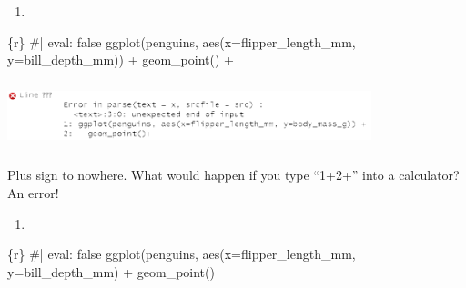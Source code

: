 \documentclass[
  letterpaper,
  DIV=11,
  numbers=noendperiod]{scrreprt}
\newenvironment{Shaded}{\begin{snugshade}}{\end{snugshade}}
\newcommand{\AttributeTok}[1]{\textcolor[rgb]{0.40,0.45,0.13}{#1}}
\newcommand{\CommentTok}[1]{\textcolor[rgb]{0.37,0.37,0.37}{#1}}
\newcommand{\FunctionTok}[1]{\textcolor[rgb]{0.28,0.35,0.67}{#1}}
\newcommand{\InformationTok}[1]{\textcolor[rgb]{0.37,0.37,0.37}{#1}}
\newcommand{\NormalTok}[1]{\textcolor[rgb]{0.00,0.23,0.31}{#1}}
\newcommand{\SpecialCharTok}[1]{\textcolor[rgb]{0.37,0.37,0.37}{#1}}
\newcommand{\StringTok}[1]{\textcolor[rgb]{0.13,0.47,0.30}{#1}}
\providecommand{\tightlist}{%
  \setlength{\itemsep}{0pt}\setlength{\parskip}{0pt}}\usepackage{longtable,booktabs,array}
\begin{document}
\begin{tcolorbox}[enhanced jigsaw, breakable, colback=white, bottomrule=.15mm, leftrule=.75mm, colframe=quarto-callout-note-color-frame, arc=.35mm, rightrule=.15mm, toprule=.15mm, left=2mm, opacityback=0]

\begin{enumerate}
\def\labelenumi{\arabic{enumi}.}
\tightlist
\item
\end{enumerate}

\begin{Shaded}
\begin{Highlighting}[]
\InformationTok{\textasciigrave{}\textasciigrave{}\textasciigrave{}\{r\}}
\CommentTok{\#| eval: false}
\FunctionTok{ggplot}\NormalTok{(penguins, }\FunctionTok{aes}\NormalTok{(}\AttributeTok{x=}\NormalTok{flipper\_length\_mm, }\AttributeTok{y=}\NormalTok{bill\_depth\_mm)) }\SpecialCharTok{+}
  \FunctionTok{geom\_point}\NormalTok{() }\SpecialCharTok{+}
\InformationTok{\textasciigrave{}\textasciigrave{}\textasciigrave{}}
\end{Highlighting}
\end{Shaded}

\includegraphics[width=4.16667in,height=0.78125in]{images/images_lecture/error_2a.png}

Plus sign to nowhere. What would happen if you type ``1+2+'' into a
calculator? An error!

\begin{enumerate}
\def\labelenumi{\arabic{enumi}.}
\setcounter{enumi}{1}
\tightlist
\item
\end{enumerate}

\begin{Shaded}
\begin{Highlighting}[]
\InformationTok{\textasciigrave{}\textasciigrave{}\textasciigrave{}\{r\}}
\CommentTok{\#| eval: false}
\FunctionTok{ggplot}\NormalTok{(penguins, }\FunctionTok{aes}\NormalTok{(}\AttributeTok{x=}\NormalTok{flipper\_length\_mm, }\AttributeTok{y=}\NormalTok{bill\_depth\_mm) }\SpecialCharTok{+}
  \FunctionTok{geom\_point}\NormalTok{()}
\StringTok{\textasciigrave{}\textasciigrave{}\textasciigrave{}}
\end{Highlighting}
\end{Shaded}


\end{tcolorbox}
\end{document}
